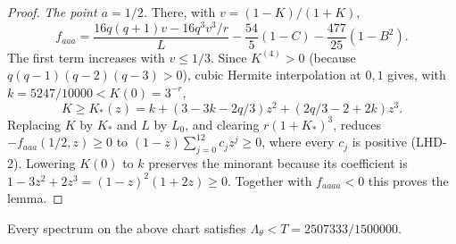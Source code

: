 \begin{proof}
\emph{The point $a=1/2$.}
There, with $v=(1-K)/(1+K)$,
\[
 f_{aaa}=\frac{16q(q+1)v-16q^3v^3/r}{L}
             -\frac{54}5(1-C)-\frac{477}{25}(1-B^2).
\]
The first term increases with $v\le1/3$. Since $K^{(4)}>0$ (because $q(q-1)(q-2)(q-3)>0$),
cubic Hermite interpolation at $0,1$ gives, with $k=5247/10000<K(0)=3^{-r}$,
\[
 K\ge K_*(z)=k+(3-3k-2q/3)z^2+(2q/3-2+2k)z^3.
\]
Replacing $K$ by $K_*$ and $L$ by $L_0$, and clearing
$r(1+K_*)^3$, reduces $-f_{aaa}(1/2,z)\ge0$ to $(1-z)\sum_{j=0}^{12}c_jz^j\ge0$, where every $c_j$ is
positive (LHD-2). Lowering $K(0)$ to $k$ preserves the minorant because its coefficient is
$1-3z^2+2z^3=(1-z)^2(1+2z)\ge0$. Together with $f_{aaaa}<0$ this proves the lemma.
\end{proof}

\begin{lemma}\label{lem:fqe-large-head-dual}
Every spectrum on the above chart satisfies
$\Lambda_\theta<T=2507333/1500000$.
\end{lemma}
